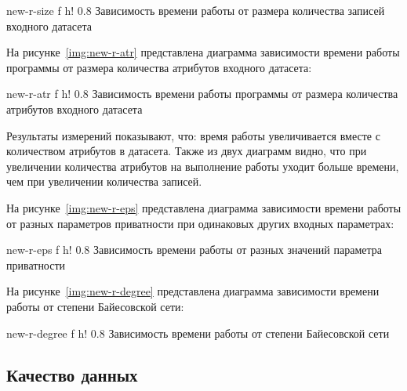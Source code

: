 {new-r-size} %
{f} %
{h!} %
{0.8\textwidth} %
{Зависимость времени работы от размера количества записей входного датасета} %

На рисунке~\ref{img:new-r-atr} представлена диаграмма зависимости времени работы программы от размера количества атрибутов входного датасета:

{new-r-atr} %
{f} %
{h!} %
{0.8\textwidth} %
{Зависимость времени работы программы от размера количества атрибутов входного датасета} %

\newpage
Результаты измерений показывают, что: время работы увеличивается вместе с количеством атрибутов в датасета. Также из двух диаграмм видно, что при увеличении количества атрибутов на выполнение работы уходит больше времени, чем при увеличении количества записей.

\newpage
На рисунке~\ref{img:new-r-eps} представлена диаграмма зависимости времени работы от разных параметров приватности при одинаковых других входных параметрах:

{new-r-eps} %
{f} %
{h!} %
{0.8\textwidth} %
{Зависимость времени работы от разных значений параметра приватности}

На рисунке~\ref{img:new-r-degree} представлена диаграмма зависимости времени работы от степени Байесовской сети:

{new-r-degree} %
{f} %
{h!} %
{0.8\textwidth} %
{Зависимость времени работы от степени Байесовской сети}

\newpage
\subsection{Качество данных}


